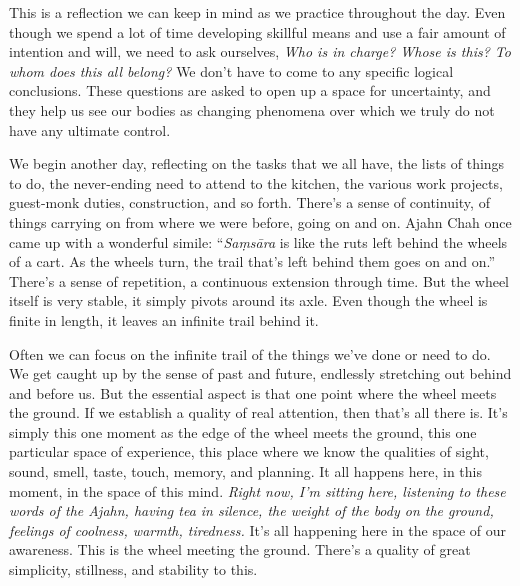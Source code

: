 This is a reflection we can keep in mind as we practice throughout the 
day. Even though we spend a lot of time developing skillful means and 
use a fair amount of intention and will, we need to ask ourselves, 
\emph{Who is in charge? Whose is this? To whom does this all belong?} 
We don't have to come to any specific logical conclusions. These 
questions are asked to open up a space for uncertainty, and they help 
us see our bodies as changing phenomena over which we truly do not have 
any ultimate control.


We begin another day, reflecting on the tasks that we all have, the 
lists of things to do, the never-ending need to attend to the kitchen, 
the various work projects, guest-monk duties, construction, and so 
forth. There's a sense of continuity, of things carrying on from where 
we were before, going on and on. Ajahn Chah once came up with a 
wonderful simile: ``\emph{Saṃsāra} is like the ruts left behind the 
wheels of a cart. As the wheels turn, the trail that's left behind them 
goes on and on.'' There's a sense of repetition, a continuous extension 
through time. But the wheel itself is very stable, it simply pivots 
around its axle. Even though the wheel is finite in length, it leaves 
an infinite trail behind it.

Often we can focus on the infinite trail of the things we've done or 
need to do. We get caught up by the sense of past and future, endlessly 
stretching out behind and before us. But the essential aspect is that 
one point where the wheel meets the ground. If we establish a quality 
of real attention, then that's all there is. It's simply this one 
moment as the edge of the wheel meets the ground, this one particular 
space of experience, this place where we know the qualities of sight, 
sound, smell, taste, touch, memory, and planning. It all happens here, 
in this moment, in the space of this mind. \emph{Right now, I'm sitting 
here, listening to these words of the Ajahn, having tea in silence, the 
weight of the body on the ground, feelings of coolness, warmth, 
tiredness.} It's all happening here in the space of our awareness. This 
is the wheel meeting the ground. There's a quality of great simplicity, 
stillness, and stability to this.

